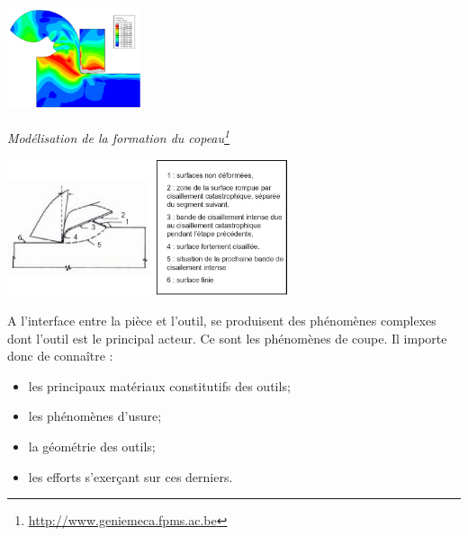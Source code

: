 \documentclass[11pt,oneside]{article}
\begin{document}
\begin{minipage}[c]{.45\linewidth}
\begin{center}
\includegraphics[height=3cm]{png/copeau}

\textit{Modélisation de la formation du copeau\footnote{\url{http://www.geniemeca.fpms.ac.be}}}
\end{center}
\end{minipage} \hfill
\begin{minipage}[c]{.45\linewidth}
\begin{center}
\includegraphics[height=4cm]{png/copeau2}

\end{center}
\end{minipage} 
\vspace{.25cm}

A l'interface entre la pièce et l'outil, se produisent des phénomènes complexes dont l'outil est le principal acteur. Ce sont les phénomènes de coupe. Il importe donc de connaître :
\begin{itemize}
\item les principaux matériaux constitutifs des outils;
\item les phénomènes d'usure;
\item la géométrie des outils;
\item les efforts s'exerçant sur ces derniers.
\end{itemize}



\end{document}
